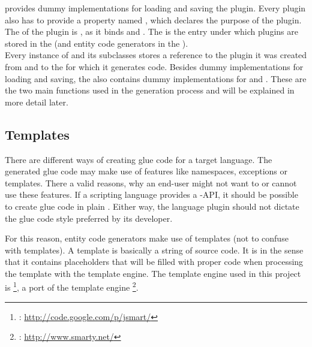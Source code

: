  provides dummy implementations for loading and saving the plugin. Every plugin also has to provide a property named , which declares the purpose of the plugin. The  of the  plugin is , as it binds  and . The  is the entry under which plugins are stored in the  (and entity code generators in the ).
\\Every instance of  and its subclasses stores a reference to the plugin it was created from and to the  for which it generates code. Besides dummy implementations for loading and saving, the  also contains dummy implementations for  and . These are the two main functions used in the generation process and will be explained in more detail later.

\subsection{Templates}

There are different ways of creating glue code for a target language. The generated glue code may make use of  features like namespaces, exceptions or templates. There a valid reasons, why an end-user might not want to or cannot use these features. If a scripting language provides a -API, it should be possible to create glue code in plain . Either way, the language plugin should not dictate the glue code style preferred by its developer.

For this reason, entity code generators make use of templates (not to confuse with  templates). A template is basically a string of  source code. It is  in the sense that it contains placeholders that will be filled with proper code when processing the template with the template engine. The template engine used in this project is \footnote{: \url{http://code.google.com/p/jsmart/}}, a  port of the  template engine \footnote{: \url{http://www.smarty.net/}}.

